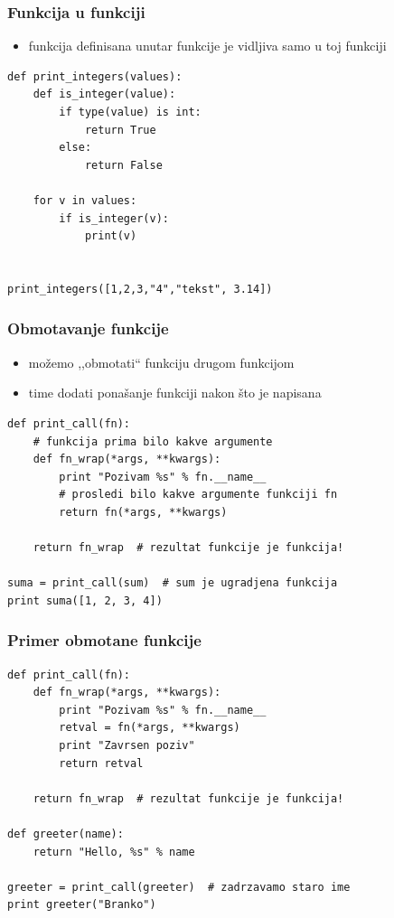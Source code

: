 \documentclass[compress]{beamer}
\begin{document}
\begin{frame}[fragile]
  \frametitle{Funkcija u funkciji}
  \begin{itemize}
    \item funkcija definisana unutar funkcije je vidljiva samo u toj funkciji
  \end{itemize}
\begin{verbatim}
def print_integers(values):
    def is_integer(value):
        if type(value) is int:
            return True
        else:
            return False

    for v in values:
        if is_integer(v):
            print(v)


print_integers([1,2,3,"4","tekst", 3.14])
\end{verbatim}
\end{frame}

\begin{frame}[fragile]
  \frametitle{Obmotavanje funkcije}
  \begin{itemize}
    \item možemo ,,obmotati`` funkciju drugom funkcijom
    \item time dodati ponašanje funkciji nakon što je napisana
  \end{itemize}
\begin{verbatim}
def print_call(fn):
    # funkcija prima bilo kakve argumente
    def fn_wrap(*args, **kwargs):
        print "Pozivam %s" % fn.__name__
        # prosledi bilo kakve argumente funkciji fn
        return fn(*args, **kwargs) 
    
    return fn_wrap  # rezultat funkcije je funkcija!

suma = print_call(sum)  # sum je ugradjena funkcija
print suma([1, 2, 3, 4])
\end{verbatim}
\end{frame}

\begin{frame}[fragile]
  \frametitle{Primer obmotane funkcije}
\begin{verbatim}
def print_call(fn):
    def fn_wrap(*args, **kwargs):
        print "Pozivam %s" % fn.__name__
        retval = fn(*args, **kwargs) 
        print "Zavrsen poziv"
        return retval
    
    return fn_wrap  # rezultat funkcije je funkcija!

def greeter(name):
    return "Hello, %s" % name

greeter = print_call(greeter)  # zadrzavamo staro ime
print greeter("Branko")
\end{verbatim}
\end{frame}
\end{document}
